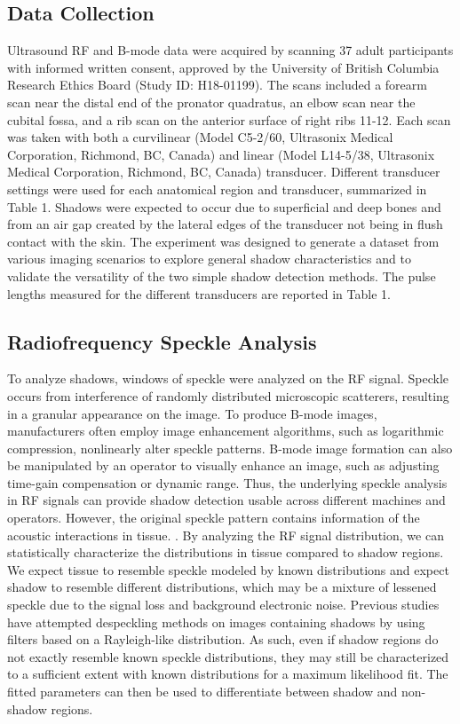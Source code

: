 \documentclass[authoryear,preprint,review,12pt]{elsarticle}
\begin{document}
\subsection*{Data Collection}
Ultrasound RF and B-mode data were acquired by scanning 37 adult participants with informed written consent, approved by the University of British Columbia Research Ethics Board (Study ID: H18-01199). The scans included a forearm scan near the distal end of the pronator quadratus, an elbow scan near the cubital fossa, and a rib scan on the anterior surface of right ribs 11-12. Each scan was taken with both a curvilinear (Model C5-2/60, Ultrasonix Medical Corporation, Richmond, BC, Canada) and linear (Model L14-5/38, Ultrasonix Medical Corporation, Richmond, BC, Canada) transducer. Different transducer settings were used for each anatomical region and transducer, summarized in Table 1. Shadows were expected to occur due to superficial and deep bones and from an air gap created by the lateral edges of the transducer not being in flush contact with the skin. The experiment was designed to generate a dataset from various imaging scenarios to explore general shadow characteristics and to validate the versatility of the two simple shadow detection methods. The pulse lengths measured for the different transducers are reported in Table 1.

\subsection*{Radiofrequency Speckle Analysis}      
To analyze shadows, windows of speckle were analyzed on the RF signal. Speckle occurs from interference of randomly distributed microscopic scatterers, resulting in a granular appearance on the image. To produce B-mode images, manufacturers often employ image enhancement algorithms, such as logarithmic compression, nonlinearly alter speckle patterns. B-mode image formation can also be manipulated by an operator to visually enhance an image, such as adjusting time-gain compensation or dynamic range. Thus, the underlying speckle analysis in RF signals can provide shadow detection usable across different machines and operators. However, the original speckle pattern contains information of the acoustic interactions in tissue. \citep{Burckhardt1978}. By analyzing the RF signal distribution, we can statistically characterize the distributions in tissue compared to shadow regions. We expect tissue to resemble speckle modeled by known distributions and expect shadow to resemble different distributions, which may be a mixture of lessened speckle due to the signal loss and background electronic noise. Previous studies have attempted despeckling methods on images containing shadows \citep{Aysal2007} by using filters based on a Rayleigh-like distribution. As such, even if shadow regions do not exactly resemble known speckle distributions, they may still be characterized to a sufficient extent with known distributions for a maximum likelihood fit. The fitted parameters can then be used to differentiate between shadow and non-shadow regions.
\end{document}
